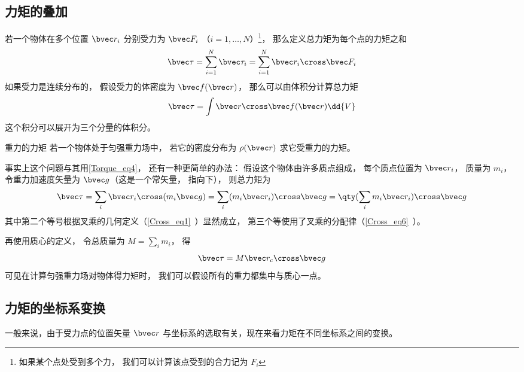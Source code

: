 \subsection{力矩的叠加}

若一个物体在多个位置 $\bvec r_i$ 分别受力为 $\bvec F_i$ （$i = 1, \dots, N$）\footnote{如果某个点处受到多个力， 我们可以计算该点受到的合力记为 $F_i$}， 那么定义总力矩为每个点的力矩之和
\begin{equation}
\bvec \tau = \sum_{i=1}^N \bvec \tau_i = \sum_{i=1}^N \bvec r_i \cross \bvec F_i
\end{equation}
如果受力是连续分布的， 假设受力的体密度为 $\bvec f(\bvec r)$， 那么可以由体积分计算总力矩
\begin{equation}\label{Torque_eq4}
\bvec \tau = \int \bvec r \cross \bvec f(\bvec r) \dd{V}
\end{equation}
这个积分可以展开为三个分量的体积分。

\begin{example}{重力的力矩}\label{Torque_ex1}
若一个物体处于匀强重力场中， 若它的密度分布为 $\rho(\bvec r)$ 求它受重力的力矩。

事实上这个问题与其用\autoref{Torque_eq4}， 还有一种更简单的办法： 假设这个物体由许多质点组成， 每个质点位置为 $\bvec r_i$， 质量为 $m_i$， 令重力加速度矢量为 $\bvec g$（这是一个常矢量， 指向下）， 则总力矩为
\begin{equation}
\bvec \tau = \sum_i \bvec r_i \cross (m_i \bvec g) = \sum_i (m_i \bvec r_i) \cross \bvec g = \qty(\sum_i m_i \bvec r_i) \cross \bvec g
\end{equation}
其中第二个等号根据叉乘的几何定义（\autoref{Cross_eq1}~）显然成立， 第三个等使用了叉乘的分配律（\autoref{Cross_eq6}~）。


再使用质心的定义， 令总质量为 $M = \sum_i m_i$， 得%
\begin{equation}
\bvec \tau = M \bvec r_c \cross \bvec g
\end{equation}
可见在计算匀强重力场对物体得力矩时， 我们可以假设所有的重力都集中与质心一点。
\end{example}

\subsection{力矩的坐标系变换}\label{Torque_sub1}
一般来说，由于受力点的位置矢量 $\bvec r$ 与坐标系的选取有关，现在来看力矩在不同坐标系之间的变换。

